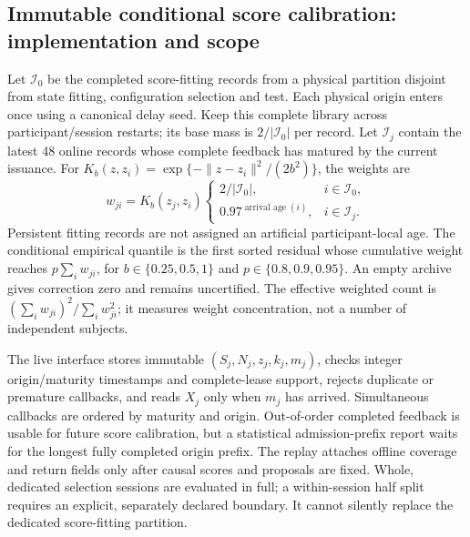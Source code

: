 \subsection{Immutable conditional score calibration: implementation and scope}
\label{app:conditional-immutable-calibration}
Let $\mathcal I_0$ be the completed score-fitting records from a
physical partition disjoint from state fitting, configuration selection
and test. Each physical origin enters once using a canonical delay seed.
Keep this complete library across participant/session restarts; its base
mass is $2/|\mathcal I_0|$ per record. Let $\mathcal I_j$ contain the
latest 48 online records whose complete feedback has matured by the
current issuance. For $K_b(z,z_i)=\exp\{-\|z-z_i\|^2/(2b^2)\}$,
the weights are
\begin{equation}
 w_{ji}=K_b(z_j,z_i)
 \begin{cases}
 2/|\mathcal I_0|,&i\in\mathcal I_0,\\
 0.97^{\operatorname{arrival\ age}(i)},&i\in\mathcal I_j.
 \end{cases}
 \label{eq:conditional-calibration-weights}
\end{equation}
Persistent fitting records are not assigned an artificial participant-local
age. The conditional empirical quantile is the first sorted residual
whose cumulative weight reaches $p\sum_iw_{ji}$, for
$b\in\{0.25,0.5,1\}$ and $p\in\{0.8,0.9,0.95\}$.
An empty archive gives correction zero and remains uncertified.
The effective weighted count is $(\sum_iw_{ji})^2/\sum_iw_{ji}^2$;
it measures weight concentration, not a number of independent subjects.

The live interface stores immutable $(S_j,N_j,z_j,k_j,m_j)$, checks
integer origin/maturity timestamps and complete-lease support, rejects
duplicate or premature callbacks, and reads $X_j$ only when $m_j$ has
arrived. Simultaneous callbacks are ordered by maturity and origin.
Out-of-order completed feedback is usable for future score calibration,
but a statistical admission-prefix report waits for the longest fully
completed origin prefix. The replay attaches offline coverage and return
fields only after causal scores and proposals are fixed. Whole, dedicated
selection sessions are evaluated in full; a within-session half split
requires an explicit, separately declared boundary. It cannot silently
replace the dedicated score-fitting partition.

